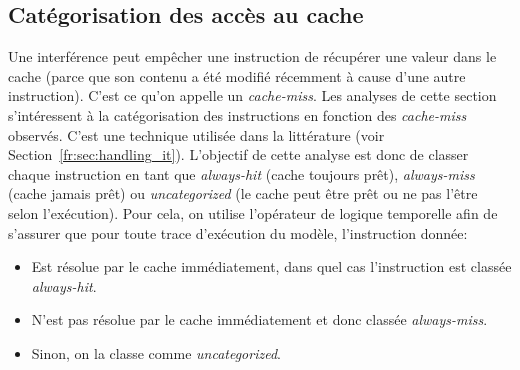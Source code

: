 \subsection{Catégorisation des accès au cache}
\label{fr:sec:cat_cache_access}
Une interférence peut empêcher une instruction de récupérer une valeur dans le cache (parce que son contenu a été modifié récemment à cause d'une autre instruction). C'est ce qu'on appelle un \emph{cache-miss}.
Les analyses de cette
section s'intéressent à la catégorisation des instructions en fonction des \emph{cache-miss} observés. C'est une technique utilisée dans la littérature (voir
Section~\ref{fr:sec:handling_it}).
L'objectif de cette analyse est donc de classer chaque instruction en
tant que \textit{always-hit} (cache toujours prêt),
\textit{always-miss} (cache jamais prêt) ou \textit{uncategorized} (le
cache peut être prêt ou ne pas l'être selon l'exécution). Pour cela,
on utilise l'opérateur de logique temporelle \agop{} afin de s'assurer
que pour toute trace d'exécution du modèle, l'instruction donnée:
\begin{itemize}
    \setlength{\itemsep}{0pt}%
   \setlength{\parskip}{0pt}%
\item Est résolue par le cache immédiatement, dans quel cas l'instruction est
classée \textit{always-hit}.
\item N'est pas résolue par le cache immédiatement et donc
classée \textit{always-miss}.
\item Sinon, on la classe comme \textit{uncategorized}.
\end{itemize}

